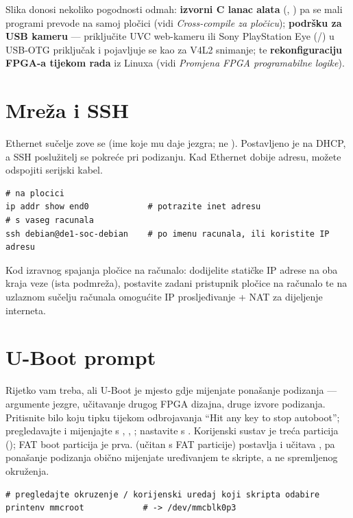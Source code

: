 \begin{note}
Slika donosi nekoliko pogodnosti odmah: \textbf{izvorni C lanac alata}
(, ) pa se mali programi prevode na samoj pločici (vidi
\emph{Cross-compile za pločicu}); \textbf{podršku za USB kameru} ---
priključite UVC web-kameru ili Sony PlayStation Eye (/)
u USB-OTG priključak i pojavljuje se kao  za V4L2 snimanje; te
\textbf{rekonfiguraciju FPGA-a tijekom rada} iz Linuxa (vidi \emph{Promjena FPGA
programabilne logike}).
\end{note}

\section{Mreža i SSH}
Ethernet sučelje zove se  (ime koje mu daje jezgra; ne ).
Postavljeno je na DHCP, a SSH poslužitelj se pokreće pri podizanju. Kad
Ethernet dobije adresu, možete odspojiti serijski kabel.
\begin{lstlisting}
# na plocici
ip addr show end0            # potrazite inet adresu
# s vaseg racunala
ssh debian@de1-soc-debian    # po imenu racunala, ili koristite IP adresu
\end{lstlisting}
\begin{tip}
Kod izravnog spajanja pločice na računalo: dodijelite statičke IP adrese na oba
kraja veze (ista podmreža), postavite zadani pristupnik pločice na računalo te na
uzlaznom sučelju računala omogućite IP prosljeđivanje + NAT za dijeljenje interneta.
\end{tip}

\section{U-Boot prompt}
Rijetko vam treba, ali U-Boot je mjesto gdje mijenjate ponašanje podizanja ---
argumente jezgre, učitavanje drugog FPGA dizajna, druge izvore podizanja.
Pritisnite bilo koju tipku tijekom odbrojavanja ``Hit any key to stop autoboot'';
pregledavajte i mijenjajte s , , ;
nastavite s . Korijenski sustav je treća particija
(); FAT boot particija je prva.  (učitan s
FAT particije) postavlja  i učitava , pa
ponašanje podizanja obično mijenjate uređivanjem te skripte, a ne spremljenog okruženja.
\begin{lstlisting}
# pregledajte okruzenje / korijenski uredaj koji skripta odabire
printenv mmcroot            # -> /dev/mmcblk0p3
\end{lstlisting}

